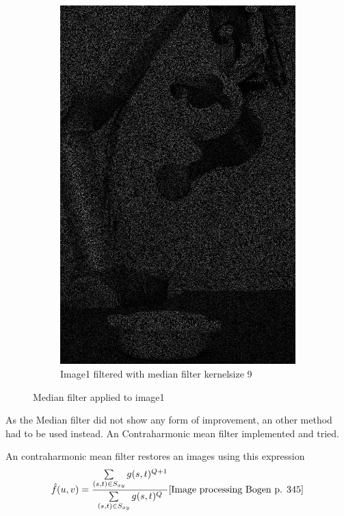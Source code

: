 \begin{figure}[H]
\begin{subfigure}[b]{0.27\textwidth}
        \includegraphics[width=\textwidth]{img1/img_1_medianBlur_9.png}
        \caption{Image1 filtered with median filter kernelsize 9}
        \label{fig:img1_median9}
    \end{subfigure}
    \caption{Median filter applied to image1}\label{fig:img_median_full}
\end{figure}

As the Median filter did not show  any form of improvement, an other method had to be used instead.  An Contraharmonic mean filter implemented and tried.  

An contraharmonic mean filter restores an images using this expression
\begin{equation}
\hat{f}(u,v) = \frac{\sum\limits_{(s,t) \in S_{xy}}g(s,t)^{Q+1}}{\sum\limits_{(s,t) \in S_{xy}}g(s,t)^{Q}}
\cite{Image processing Bogen p. 345}
\label{eq:Contra}
\end{equation}

